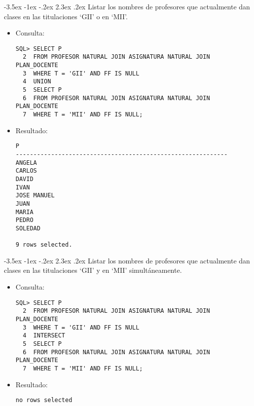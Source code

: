 \documentclass[11pt]{report}
\makeatletter
\renewcommand\chapter{\@startsection{chapter}{0}{\z@}%
    {-3.5ex \@plus -1ex \@minus -.2ex}%
    {2.3ex \@plus.2ex}%
    {\normalfont\Large\bfseries}}
\makeatother
\begin{document}
\chapter{Listar los nombres de profesores que actualmente dan clases en las titulaciones ‘GII’ o en ‘MII’.}
\begin{itemize}
  \item Consulta:
  \begin{verbatim}
SQL> SELECT P
  2  FROM PROFESOR NATURAL JOIN ASIGNATURA NATURAL JOIN PLAN_DOCENTE
  3  WHERE T = 'GII' AND FF IS NULL
  4  UNION
  5  SELECT P
  6  FROM PROFESOR NATURAL JOIN ASIGNATURA NATURAL JOIN PLAN_DOCENTE
  7  WHERE T = 'MII' AND FF IS NULL;
  \end{verbatim}
  \item{Resultado:}
  \begin{verbatim}
P                                                                               
------------------------------------------------------------                    
ANGELA                                                                          
CARLOS                                                                          
DAVID                                                                           
IVAN                                                                            
JOSE MANUEL                                                                     
JUAN                                                                            
MARIA                                                                           
PEDRO                                                                           
SOLEDAD                                                                         

9 rows selected.                                                                   
  \end{verbatim}
\end{itemize}

\newpage

\chapter{Listar los nombres de profesores que actualmente dan clases en las titulaciones ‘GII’ y en ‘MII’ simultáneamente.}
\begin{itemize}
  \item Consulta:
  \begin{verbatim}
SQL> SELECT P
  2  FROM PROFESOR NATURAL JOIN ASIGNATURA NATURAL JOIN PLAN_DOCENTE
  3  WHERE T = 'GII' AND FF IS NULL
  4  INTERSECT
  5  SELECT P
  6  FROM PROFESOR NATURAL JOIN ASIGNATURA NATURAL JOIN PLAN_DOCENTE
  7  WHERE T = 'MII' AND FF IS NULL;
  \end{verbatim}
  \item{Resultado:}
  \begin{verbatim}
no rows selected
  \end{verbatim}
\end{itemize}
\end{document}
